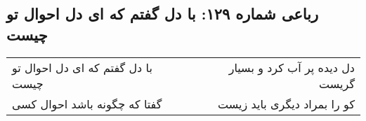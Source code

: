 \begin{center}
\section*{رباعی شماره ۱۲۹: با دل گفتم که ای دل احوال تو چیست}
\label{sec:sh129}
\begin{longtable}{l p{0.5cm} r}
با دل گفتم که ای دل احوال تو چیست
&&
دل دیده پر آب کرد و بسیار گریست
\\
گفتا که چگونه باشد احوال کسی
&&
کو را بمراد دیگری باید زیست
\\
\end{longtable}
\end{center}
